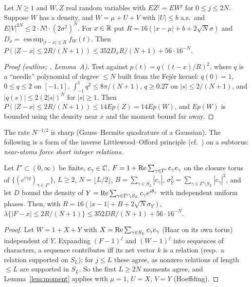 \begin{lemma}\label{lem:moment}
Let $N\ge1$ and $W,Z$ real random variables with $EZ^j=EW^j$ for $0\le j\le2N$. Suppose $W$ has a density, and $W=\mu+U+V$ with $|U|\le b$ a.s.\ and $E|V|^{2N}\le2\cdot N!\cdot(2\sigma^2)^N$. For $x\in\mathbb R$ put $R=16(|x-\mu|+b+2\sqrt N\sigma)$ and $D_x=\operatorname{ess\,sup}_{|t-x|\le R}f_W(t)$. Then $P(|Z-x|\le2R/(N+1))\le352D_xR/(N+1)+56\cdot16^{-N}$.
\end{lemma}

\begin{proof}[Proof (outline; , Lemma~A)]
Test against $p(t)=q((t-x)/R)^2$, where $q$ is a ``needle'' polynomial of degree $\le N$ built from the Fej\'er kernel: $q(0)=1$, $0\le q\le2$ on $[-1,1]$, $\int_{-1}^1q^2\le8\pi/(N+1)$, $q\ge0.27$ on $|s|\le2/(N+1)$, and $|q(s)|\le2(2|s|)^N$ for $|s|\ge1$. Then $P(|Z-x|\le2R/(N+1))\le14Ep(Z)=14Ep(W)$, and $Ep(W)$ is bounded using the density near $x$ and the moment bound far away.
\end{proof}

The rate $N^{-1/2}$ is sharp (Gauss--Hermite quadrature of a Gaussian). The following is a form of the inverse Littlewood--Offord principle (cf.\ \cite{NV}) on a subtorus: \emph{near-atoms force short integer relations}.

\begin{proposition}\label{prop:Bprime}
Let $\Gamma'\subset(0,\infty)$ be finite, $c_\gamma\in\mathbb C$, $F=1+\operatorname{Re}\sum_{\gamma\in\Gamma'}c_\gamma e_\gamma$ on the closure torus of $\{(e^{i\gamma y})_{\gamma\in\Gamma'}\}$, $L\ge2$, $N=\lfloor L/2\rfloor$, $B=\sum_{\gamma\in S_L}|c_\gamma|$, $\sigma_Y^2=\sum_{\gamma\in\Gamma'\setminus S_L}|c_\gamma|^2$, and let $D$ bound the density of $Y=\operatorname{Re}\sum_{\gamma\in\Gamma'\setminus S_L}c_\gamma e^{i\theta_\gamma}$ with independent uniform phases. Then, with $R=16(|x-1|+B+2\sqrt N\sigma_Y)$, $\lambda\{|F-x|\le2R/(N+1)\}\le352DR/(N+1)+56\cdot16^{-N}$.
\end{proposition}

\begin{proof}
Let $W=1+X+Y$ with $X=\operatorname{Re}\sum_{\gamma\in S_L}c_\gamma e_\gamma$ (Haar on its own torus) independent of $Y$. Expanding $(F-1)^j$ and $(W-1)^j$ into sequences of characters, a sequence contributes iff its net vector $k$ is a relation (resp.\ a relation supported on $S_L$); for $j\le L$ these agree, as nonzero relations of length $\le L$ are supported in $S_L$. So the first $L\ge2N$ moments agree, and Lemma~\ref{lem:moment} applies with $\mu=1$, $U=X$, $V=Y$ (Hoeffding).
\end{proof}

